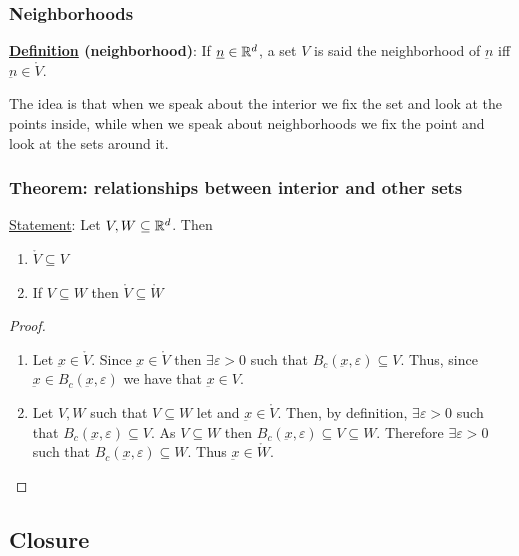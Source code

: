 \documentclass[10pt]{extarticle}
\renewcommand{\vec}[1]{\underbar{\ensuremath{#1}}}
\begin{document}
\subsubsection{Neighborhoods}

\textbf{\underline{Definition} (neighborhood)}:
If $\vec{n} \in \R^d$, a set $V$ is said the neighborhood of $\vec{n}$ iff $\vec{n} \in \mathring{V}$.

The idea is that when we speak about the interior we fix the set and look at the points inside, while when we speak about neighborhoods we fix the point and look at the sets around it.

\subsubsection{Theorem: relationships between interior and other sets}

\underline{Statement}: Let $V, W \subseteq \mathbb{R}^d$.
Then

\begin{enumerate}
    \item $\mathring{V} \subseteq V$
    \item If $V \subseteq W$ then $\mathring{V} \subseteq \mathring{W}$
\end{enumerate}

\begin{proof}
    \skiplineafterproof
    \begin{enumerate}
        \item Let $\vec{x} \in \mathring{V}$.
              Since $\vec{x} \in \mathring{V}$ then $\exists \varepsilon > 0$ such that $B_c(\vec{x}, \varepsilon) \subseteq V$.
              Thus, since $\vec{x} \in B_c(\vec{x}, \varepsilon)$ we have that $\vec{x} \in V$.
        \item Let $V, W$ such that $V \subseteq W$ let and $\vec{x} \in \mathring{V}$.
              Then, by definition, $\exists \varepsilon > 0$ such that $B_c(\vec{x}, \varepsilon) \subseteq V$.
              As $V \subseteq W$ then $B_c(\vec{x}, \varepsilon) \subseteq V \subseteq W$.
              Therefore $\exists \varepsilon > 0$ such that $B_c(\vec{x}, \varepsilon) \subseteq W$.
              Thus $\vec{x} \in \mathring{W}$.
    \end{enumerate}
\end{proof}

\subsection{Closure}
\end{document}

